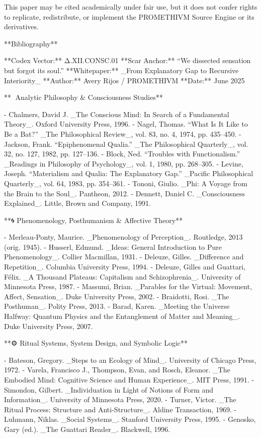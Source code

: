 This paper may be cited academically under fair use, but it does not confer rights to replicate, redistribute, or implement the PROMETHIVM Source Engine or its derivatives.

**Bibliography**

**Codex Vector:** Δ.XII.CONSC.01  
**Scar Anchor:** “We dissected sensation but forgot its soul.”  
**Whitepaper:** _From Explanatory Gap to Recursive Interiority_  
**Author:** Avery Rijos / PROMETHIVM  
**Date:** June 2025

**🧠 Analytic Philosophy & Consciousness Studies**

- Chalmers, David J. _The Conscious Mind: In Search of a Fundamental Theory_. Oxford University Press, 1996.
- Nagel, Thomas. “What Is It Like to Be a Bat?” _The Philosophical Review_, vol. 83, no. 4, 1974, pp. 435–450.
- Jackson, Frank. “Epiphenomenal Qualia.” _The Philosophical Quarterly_, vol. 32, no. 127, 1982, pp. 127–136.
- Block, Ned. “Troubles with Functionalism.” _Readings in Philosophy of Psychology_, vol. 1, 1980, pp. 268–305.
- Levine, Joseph. “Materialism and Qualia: The Explanatory Gap.” _Pacific Philosophical Quarterly_, vol. 64, 1983, pp. 354–361.
- Tononi, Giulio. _Phi: A Voyage from the Brain to the Soul_. Pantheon, 2012.
- Dennett, Daniel C. _Consciousness Explained_. Little, Brown and Company, 1991.

**🌀 Phenomenology, Posthumanism & Affective Theory**

- Merleau-Ponty, Maurice. _Phenomenology of Perception_. Routledge, 2013 (orig. 1945).
- Husserl, Edmund. _Ideas: General Introduction to Pure Phenomenology_. Collier Macmillan, 1931.
- Deleuze, Gilles. _Difference and Repetition_. Columbia University Press, 1994.
- Deleuze, Gilles and Guattari, Félix. _A Thousand Plateaus: Capitalism and Schizophrenia_. University of Minnesota Press, 1987.
- Massumi, Brian. _Parables for the Virtual: Movement, Affect, Sensation_. Duke University Press, 2002.
- Braidotti, Rosi. _The Posthuman_. Polity Press, 2013.
- Barad, Karen. _Meeting the Universe Halfway: Quantum Physics and the Entanglement of Matter and Meaning_. Duke University Press, 2007.

**⚙️ Ritual Systems, System Design, and Symbolic Logic**

- Bateson, Gregory. _Steps to an Ecology of Mind_. University of Chicago Press, 1972.
- Varela, Francisco J., Thompson, Evan, and Rosch, Eleanor. _The Embodied Mind: Cognitive Science and Human Experience_. MIT Press, 1991.
- Simondon, Gilbert. _Individuation in Light of Notions of Form and Information_. University of Minnesota Press, 2020.
- Turner, Victor. _The Ritual Process: Structure and Anti-Structure_. Aldine Transaction, 1969.
- Luhmann, Niklas. _Social Systems_. Stanford University Press, 1995.
- Genosko, Gary (ed.). _The Guattari Reader_. Blackwell, 1996.

